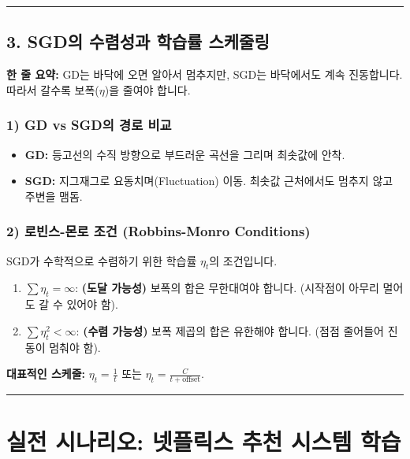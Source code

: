 \documentclass[11pt,a4paper]{book}
\theoremstyle{definition}
\begin{document}
\vspace{0.5cm}\hrule\vspace{0.5cm}

\subsection{3. SGD의 수렴성과 학습률 스케줄링}

\begin{conceptbox}[title={개념 3: 멈추는 법을 배워라}]
\textbf{한 줄 요약:} GD는 바닥에 오면 알아서 멈추지만, SGD는 바닥에서도 계속 진동합니다. 따라서 갈수록 보폭($\eta$)을 줄여야 합니다.
\end{conceptbox}


\subsubsection*{1) GD vs SGD의 경로 비교}
\begin{itemize}
    \item \textbf{GD:} 등고선의 수직 방향으로 부드러운 곡선을 그리며 최솟값에 안착.
    \item \textbf{SGD:} 지그재그로 요동치며(Fluctuation) 이동. 최솟값 근처에서도 멈추지 않고 주변을 맴돔.
\end{itemize}

\subsubsection*{2) 로빈스-몬로 조건 (Robbins-Monro Conditions)}
SGD가 수학적으로 수렴하기 위한 학습률 $\eta_t$의 조건입니다.
\begin{enumerate}
    \item $\sum \eta_t = \infty$: \textbf{(도달 가능성)} 보폭의 합은 무한대여야 합니다. (시작점이 아무리 멀어도 갈 수 있어야 함).
    \item $\sum \eta_t^2 < \infty$: \textbf{(수렴 가능성)} 보폭 제곱의 합은 유한해야 합니다. (점점 줄어들어 진동이 멈춰야 함).
\end{enumerate}
\textbf{대표적인 스케줄:} $\eta_t = \frac{1}{t}$ 또는 $\eta_t = \frac{C}{t + \text{offset}}$.

\vspace{0.5cm}\hrule\vspace{0.5cm}

\section{실전 시나리오: 넷플릭스 추천 시스템 학습}
\end{document}
